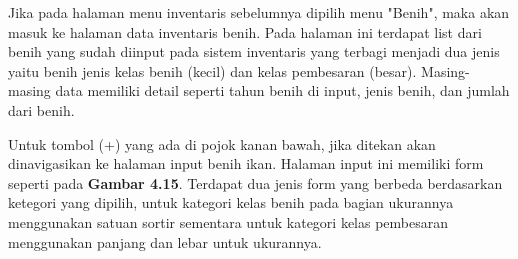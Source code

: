 \begin{spacing}{1.5}
	Jika pada halaman menu inventaris sebelumnya dipilih menu "Benih", maka akan masuk ke halaman data inventaris benih. Pada halaman ini terdapat list dari benih yang sudah diinput pada sistem inventaris yang terbagi menjadi dua jenis yaitu benih jenis kelas benih (kecil) dan kelas pembesaran (besar). Masing-masing data memiliki detail seperti tahun benih di input, jenis benih, dan jumlah dari benih.

	Untuk tombol (+) yang ada di pojok kanan bawah, jika ditekan akan dinavigasikan ke halaman input benih ikan. Halaman input ini memiliki form seperti pada \textbf{Gambar 4.15}. Terdapat dua jenis form yang berbeda berdasarkan ketegori yang dipilih, untuk kategori kelas benih pada bagian ukurannya menggunakan satuan sortir sementara untuk kategori kelas pembesaran menggunakan panjang dan lebar untuk ukurannya.


\end{spacing}
